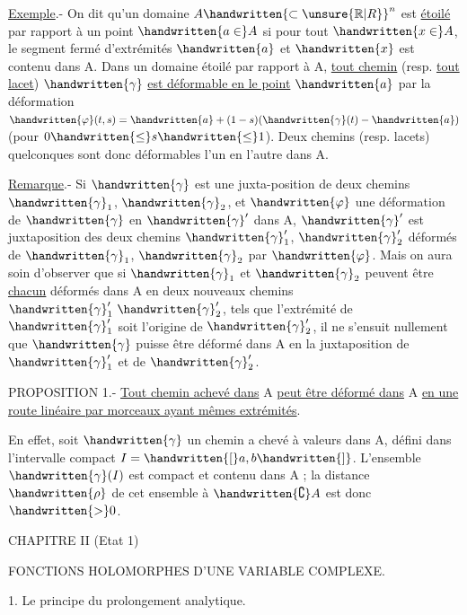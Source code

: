 \uline{Exemple}.- On dit qu'un domaine $A\handwritten{\subset\unsure{\mathbb{R}|R}}^n$ est \uline{étoilé} par rapport à un point $\handwritten{a\in}A$ si pour tout $\handwritten{x\in}A$, le segment fermé d'extrémités $\handwritten{a}$ et $\handwritten{x}$ est contenu dans A. Dans un domaine étoilé par rapport à A, \uline{tout chemin} (resp. \uline{tout lacet}) $\handwritten{\gamma}$ \uline{est déformable en le point} $\handwritten{a}$ par la déformation $\handwritten{\varphi}(t,s)=\handwritten{a}+(1-s)(\handwritten{\gamma}(t)-\handwritten{a})$ (pour $0\handwritten{\leq}s\handwritten{\leq}1$). Deux chemins (resp. lacets) quelconques sont donc déformables l'un en l'autre dans A.

\uline{Remarque}.- Si $\handwritten{\gamma}$ est une juxta-position de deux chemins $\handwritten{\gamma}_1$, $\handwritten{\gamma}_2$, et $\handwritten{\varphi}$ une déformation de $\handwritten{\gamma}$ en $\handwritten{\gamma}'$ dans A, $\handwritten{\gamma}'$ est juxtaposition des deux chemins $\handwritten{\gamma}'_1$, $\handwritten{\gamma}'_2$ déformés de $\handwritten{\gamma}_1$, $\handwritten{\gamma}_2$ par $\handwritten{\varphi}$. Mais on aura soin d'observer que si $\handwritten{\gamma}_1$ et $\handwritten{\gamma}_2$ peuvent être \uline{chacun} déformés dans A en deux nouveaux chemins $\handwritten{\gamma}'_1\ \handwritten{\gamma}'_2$, tels que l'extrémité de $\handwritten{\gamma}'_1$ soit l'origine de $\handwritten{\gamma}'_2$, il ne s'ensuit nullement que $\handwritten{\gamma}$ puisse être déformé dans A en la juxtaposition de $\handwritten{\gamma}'_1$ et de $\handwritten{\gamma}'_2$.

PROPOSITION 1.- \uline{Tout chemin achevé dans} A \uline{peut être déformé dans} A \uline{en une route linéaire par morceaux ayant mêmes extrémités}.

En effet, soit $\handwritten{\gamma}$ un chemin a chevé à valeurs dans A, défini dans l'intervalle compact $I=\handwritten{[}a,b\handwritten{]}$. L'ensemble $\handwritten{\gamma}(I)$ est compact et contenu dans A ; la distance $\handwritten{\rho}$ de cet ensemble à $\handwritten{\complement}A$ est donc $\handwritten{>}0$.
\begin{center}
CHAPITRE II (Etat 1)

FONCTIONS HOLOMORPHES D'UNE VARIABLE COMPLEXE.

1. Le principe du prolongement analytique.
\end{center}

